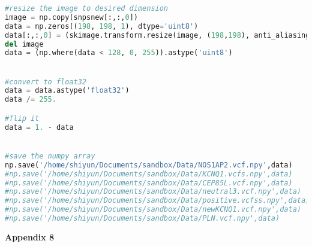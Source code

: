 \begin{lstlisting}[language=Python,breaklines]
#resize the image to desired dimension
image = np.copy(snpsnew[:,:,0])
data = np.zeros((198, 198, 1), dtype='uint8')
data[:,:,0] = (skimage.transform.resize(image, (198,198), anti_aliasing=True, mode='reflect')*255).astype('uint8')
del image
data = (np.where(data < 128, 0, 255)).astype('uint8')


#convert to float32
data = data.astype('float32')
data /= 255.

#flip it
data = 1. - data


#save the numpy array
np.save('/home/shiyun/Documents/sandbox/Data/NOS1AP2.vcf.npy',data)
#np.save('/home/shiyun/Documents/sandbox/Data/KCNQ1.vcfs.npy',data)
#np.save('/home/shiyun/Documents/sandbox/Data/CEP85L.vcf.npy',data)
#np.save('/home/shiyun/Documents/sandbox/Data/neutral3.vcf.npy',data)
#np.save('/home/shiyun/Documents/sandbox/Data/positive.vcfss.npy',data)
#np.save('/home/shiyun/Documents/sandbox/Data/newKCNQ1.vcf.npy',data)
#np.save('/home/shiyun/Documents/sandbox/Data/PLN.vcf.npy',data)
\end{lstlisting}



\cleardoublepage\clearpage
\large \vspace{1cm}
{\bf Appendix 8} 
\small 

